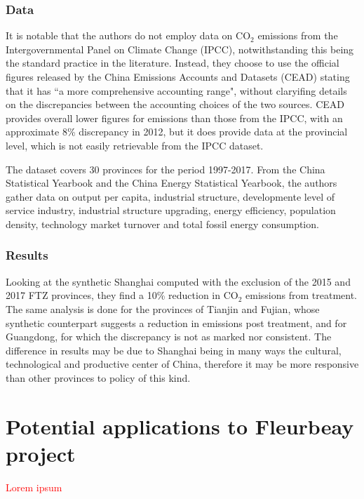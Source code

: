 \documentclass[12pt,a4paper,draft]{article}
\begin{document}
\subsubsection*{Data}
It is notable that the authors do not employ data on CO$_2$ emissions from the 
Intergovernmental Panel on Climate Change (IPCC), notwithstanding this being the 
standard practice in the literature. Instead, they choose to use the official 
figures released by the China Emissions Accounts and Datasets (CEAD) stating that 
it has ``a more comprehensive accounting range", without claryifing details on the 
discrepancies between the accounting choices of the two sources. CEAD provides 
overall lower figures for emissions than those from the IPCC, with an approximate 
8\% discrepancy in 2012, but it does provide data at the provincial level, which is 
not easily retrievable from the IPCC dataset.  

The dataset covers 30 provinces for the period 1997-2017. 
From the China Statistical 
Yearbook and the China Energy Statistical Yearbook, the authors gather data on 
output per capita, industrial structure, developmente level of service industry, 
industrial structure upgrading, energy efficiency, population density, technology 
market turnover and total fossil energy consumption. 



\subsubsection*{Results}
Looking at the synthetic Shanghai computed with the exclusion of the 2015 and 2017 
FTZ provinces, they find a 10\% reduction in CO$_2$ emissions from treatment. 
The same analysis is done for the provinces of Tianjin and Fujian, whose synthetic 
counterpart suggests a reduction in emissions post treatment, and for Guangdong, 
for which the discrepancy is not as marked nor consistent. 
The difference in results may be due to Shanghai being in many ways the cultural, 
technological and productive center of China, therefore it may be more responsive 
than other provinces to policy of this kind. 



\section{Potential applications to Fleurbeay project} %
\textcolor{red}{Lorem ipsum}
\end{document}
